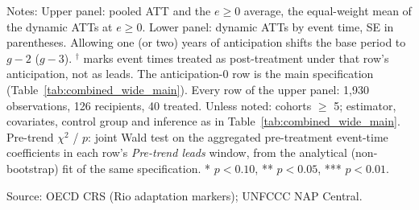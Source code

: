 \begin{table}[H]
\begin{minipage}{\linewidth}
Notes: Upper panel: pooled ATT and the $e \geq 0$ average, the equal-weight mean of the dynamic ATTs at $e \geq 0$. Lower panel: dynamic ATTs by event time, SE in parentheses. Allowing one (or two) years of anticipation shifts the base period to $g-2$ ($g-3$). $^{\dagger}$ marks event times treated as post-treatment under that row's anticipation, not as leads. The anticipation-0 row is the main specification (Table~\ref{tab:combined_wide_main}). Every row of the upper panel: 1,930 observations, 126 recipients, 40 treated. Unless noted: cohorts $\geq$ 5; estimator, covariates, control group and inference as in Table~\ref{tab:combined_wide_main}. Pre-trend $\chi^2$ / $p$: joint Wald test on the aggregated pre-treatment event-time coefficients in each row's \emph{Pre-trend leads} window, from the analytical (non-bootstrap) fit of the same specification. * $p<0.10$, ** $p<0.05$, *** $p<0.01$.\par
Source: OECD CRS (Rio adaptation markers); UNFCCC NAP Central.
\end{minipage}
\end{table}

